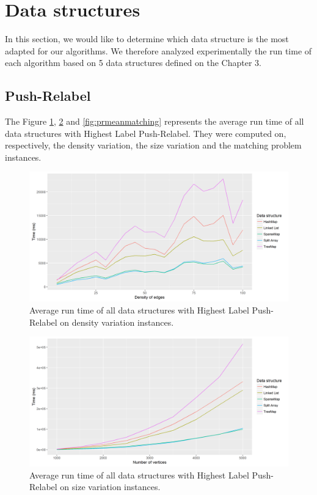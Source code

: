 \section{Data structures}

\label{sec:datastructuress}
In this section, we would like to determine which data structure is the most adapted for our algorithms. We therefore analyzed experimentally the run time of each algorithm based on 5 data structures defined on the Chapter 3.
\subsection{Push-Relabel}	
The Figure \ref{fig:prmeandensity}, \ref{fig:prmeansize} and \ref{fig:prmeanmatching} represents the average run time of all data structures with Highest Label Push-Relabel. They were computed on, respectively, the density variation, the size variation and the matching problem instances.
\begin{figure}[H]
\begin{center}
\includegraphics[scale=0.63]{images/results/prmeandensity.png}
\caption{Average run time of all data structures with Highest Label Push-Relabel on density variation instances.}
\label{fig:prmeandensity}
\end{center}
\end{figure}
\begin{figure}[H]
\begin{center}
\includegraphics[scale=0.6]{images/results/prmeansize.png}
\caption{Average run time of all data structures with Highest Label Push-Relabel on size variation instances.}
\label{fig:prmeansize}
\end{center}
\end{figure}
